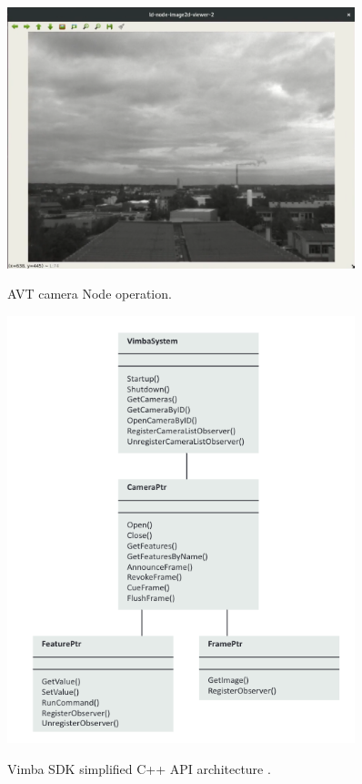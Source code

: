 \documentclass[a4paper, 12pt, oneside]{report}
\begin{document}
  \begin{figure}[h]
      \caption{AVT camera Node operation.}
      \centering
      \includegraphics[width=0.9\textwidth]{avtcamoutput}
      \label{fig:avt_output}
  \end{figure}

  \begin{figure}[h]
     \caption{Vimba SDK simplified C++ API architecture \protect\cite{VimbaTheSDKforAlliedVisionCamerasAlliedVision-2020-02-17}.}
     \centering
     \includegraphics[width=0.9\textwidth]{vimba_cpp_simplified}
     \label{fig:vimba avt_cpp_api}
  \end{figure}
  
\end{document}

